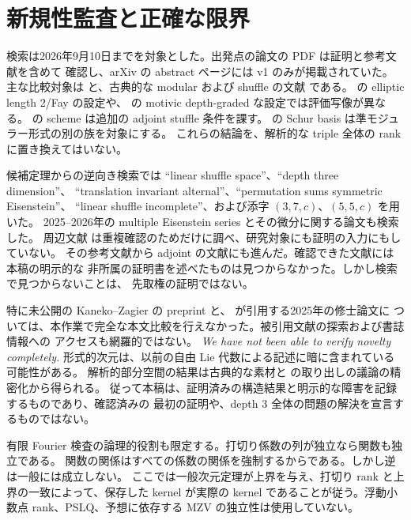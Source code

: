 \documentclass[12pt]{amsart}
\theoremstyle{definition}
\theoremstyle{remark}
\numberwithin{equation}{section}
\numberwithin{equation}{section}
\begin{document}
\section{新規性監査と正確な限界}
検索は2026年9月10日までを対象とした。出発点の論文の PDF は証明と参考文献を含めて
確認し、arXiv の abstract ページには v1 のみが掲載されていた。
主な比較対象は \cite{j-bt,j-matthes,j-brown,j-anzawa,j-bim,j-kanno,j-bk,j-by} と、古典的な modular および
shuffle の文献 \cite{j-gkz,j-kzqm,j-hirose,j-reutenauer} である。
\cite{j-matthes} の elliptic length 2/Fay の設定や、\cite{j-brown} の motivic
depth-graded な設定では評価写像が異なる。
\cite{j-anzawa} の scheme は追加の adjoint stuffle 条件を課す。
\cite{j-by} の Schur basis は準モジュラー形式の別の族を対象にする。
これらの結論を、解析的な triple 全体の rank に置き換えてはいない。

候補定理からの逆向き検索では ``linear shuffle space''、``depth three dimension''、
``translation invariant alternal''、``permutation sums symmetric Eisenstein''、
``linear shuffle incomplete''、および添字 $(3,7,c)$、$(5,5,c)$ を用いた。
2025--2026年の multiple Eisenstein series とその微分に関する論文も検索した。
周辺文献 \cite{j-br} は重複確認のためだけに調べ、研究対象にも証明の入力にもしていない。
その参考文献から adjoint の文献にも進んだ。確認できた文献には本稿の明示的な
非所属の証明書を述べたものは見つからなかった。しかし検索で見つからないことは、
先取権の証明ではない。

特に未公開の Kaneko--Zagier の preprint と、\cite{j-br} が引用する2025年の修士論文に
ついては、本作業で完全な本文比較を行えなかった。被引用文献の探索および書誌情報への
アクセスも網羅的ではない。
\emph{We have not been able to verify novelty completely.}
形式的次元は、以前の自由 Lie 代数による記述に暗に含まれている可能性がある。
解析的部分空間の結果は古典的な素材と \cite{j-hst} の取り出しの議論の精密化から得られる。
従って本稿は、証明済みの構造結果と明示的な障害を記録するものであり、確認済みの
最初の証明や、depth 3 全体の問題の解決を宣言するものではない。

有限 Fourier 検査の論理的役割も限定する。打切り係数の列が独立なら関数も独立である。
関数の関係はすべての係数の関係を強制するからである。しかし逆は一般には成立しない。
ここでは一般次元定理が上界を与え、打切り rank と上界の一致によって、保存した
kernel が実際の kernel であることが従う。浮動小数点 rank、PSLQ、予想に依存する
MZV の独立性は使用していない。

\appendix
\renewcommand{\thesection}{J.\Alph{section}}
\renewcommand{\theHsection}{J.\Alph{section}}
\end{document}
